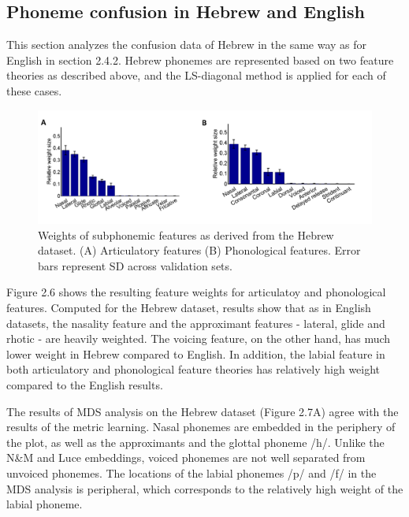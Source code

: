 \subsection{Phoneme confusion in Hebrew and English}
This section analyzes the confusion data of Hebrew in the same way as for English in section 2.4.2. Hebrew phonemes are represented based on two feature theories as described above, and the LS-diagonal method is applied for each of these cases.

\begin{figure}[t]
\vspace{.3in}
\includegraphics[width=\linewidth]{Figures/Ch2/weight_Heb.PNG}
\caption{Weights of subphonemic features as derived from the Hebrew dataset. (A) Articulatory features (B) Phonological features. Error bars represent SD across validation sets.}
\end{figure}

Figure 2.6 shows the resulting feature weights for articulatoy and phonological features. Computed for the Hebrew dataset, results show that as in English datasets, the nasality feature and the approximant features - lateral, glide and rhotic - are heavily weighted. The voicing feature, on the other hand, has much lower weight in Hebrew compared to English. In addition, the labial feature in both articulatory and phonological feature theories has relatively high weight compared to the English results.

The results of MDS analysis on the Hebrew dataset (Figure 2.7A) agree with the results of the metric learning. Nasal phonemes are embedded in the periphery of the plot, as well as the approximants and the glottal phoneme /h/. Unlike the N\&M and Luce embeddings, voiced phonemes are not well separated from unvoiced phonemes. The locations of the labial phonemes /p/ and /f/ in the MDS analysis is peripheral, which corresponds to the relatively high weight of the labial phoneme. 

